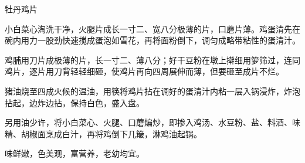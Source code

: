 %
%
%
%
%
%
%
\begin{recipe}{牡丹鸡片}

\ingredients


\preparation

\step 小白菜心淘洗干净，火腿片成长一寸二、宽八分极薄的片，口蘑片薄。鸡蛋清先在
碗内用力一股劲快速搅成蛋泡如雪花，再将面粉倒下，调匀成略带粘性的蛋清汁。

\step 鸡脯用刀片成极薄的片，长一寸二、薄八分；好干豆粉在墩上擀细用箩筛过，连同
鸡片，逐片用刀背轻轻细砸，使鸡片再向四周展伸而薄，但要砸至成片不烂。

\step 猪油烧至四成火候的温油，用筷将鸡片拈在调好的蛋清汁内粘一层入锅浸炸，炸泡
拈起，边炸边拈，保持白色，盛入盘。

\step 另用油少许，将小白菜心、火腿、口蘑煸炒，即掺入鸡汤、水豆粉、盐、料酒、味
精、胡椒面烹成白汁，再将鸡倒下几簸，淋鸡油起锅。

\features

味鲜嫩，色美观，富营养，老幼均宜。

\end{recipe}

